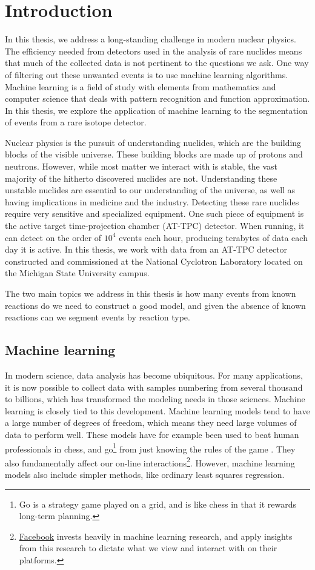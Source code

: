 \chapter{Introduction}\label{ch:introduction}


In this thesis, we address a long-standing challenge in modern nuclear physics. 
The efficiency needed from detectors used in the analysis of rare nuclides means that much of the collected data is not pertinent to the questions we ask. One way of filtering out these unwanted events is to use machine learning algorithms. Machine learning is a field of study with elements from mathematics and computer science that deals with pattern recognition and function approximation. In this thesis, we explore the application of machine learning to the segmentation of events from a rare isotope detector.

Nuclear physics is the pursuit of understanding nuclides, which are the building blocks of the visible universe. These building blocks are made up of protons and neutrons. However, while most matter we interact with is stable, the vast majority of the hitherto discovered nuclides are not. Understanding these unstable nuclides are essential to our understanding of the universe, as well as having implications in medicine and the industry. Detecting these rare nuclides require very sensitive and specialized equipment. One such piece of equipment is the active target time-projection chamber (AT-TPC) detector. When running, it can detect on the order of $10^4$ events each hour, producing terabytes of data each day it is active. In this thesis, we work with data from an AT-TPC detector constructed and commissioned at the National Cyclotron Laboratory located on the Michigan State University campus. 

The two main topics we address in this thesis is how many events from known reactions do we need to construct a good model, and given the absence of known reactions can we segment events by reaction type. 
\section{Machine learning}

In modern science, data analysis has become ubiquitous. For many applications, it is now possible to collect data with samples numbering from several thousand to billions, which has transformed the modeling needs in those sciences. Machine learning is closely tied to this development. Machine learning models tend to have a large number of degrees of freedom, which means they need large volumes of data to perform well. These models have for example been used to beat human professionals in chess, and go\footnote{Go is a strategy game played on a grid, and is like chess in that it rewards long-term planning.} from just knowing the rules of the game \cite{Silver2018}. They also fundamentally affect our on-line interactions\footnote{\href{https://research.fb.com/category/machine-learning/}{Facebook} invests heavily in machine learning research, and apply insights from this research to dictate what we view and interact with on their platforms.}. However, machine learning models also include simpler methods, like ordinary least squares regression. 

